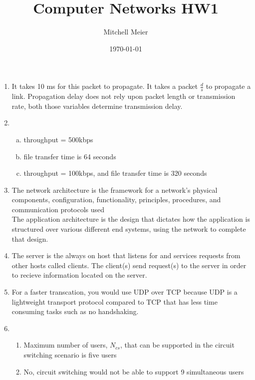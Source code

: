 \documentclass[14pt]{article}
\title{Computer Networks HW1}
\author{Mitchell Meier}
\date{\today}
\begin{document}
\maketitle

\begin{enumerate}

\item 
It takes 10 ms for this packet to propagate. It takes a packet $\frac{d}{s}$ to propagate a link. Propagation delay does not rely upon packet length or transmission rate, both those variables determine transmission delay.

\item
\begin{enumerate}[(a)]
\item throughput = 500kbps
\item file transfer time is 64 seconds
\item throughput = 100kbps, and file transfer time is 320 seconds

\end{enumerate}

\item
The network architecture is the framework for a network's physical components, configuration, functionality, principles, procedures, and communication protocols used \\
The application architecture is the design that dictates how the application is structured over various different end systems, using the network to complete that design.

\item
The server is the always on host that listens for and services requests from other hosts called clients. The client(s) send request(s) to the server in order to recieve information located on the server. 

\item
For a faster transcation, you would use UDP over TCP because UDP is a lightweight transport protocol compared to TCP that has less time consuming tasks such as no handshaking. 

\item
\begin{enumerate}[1.]
\item
Maximum number of users, $N_{cs}$, that can be supported in the circuit switching scenario is five users

\item
No, circuit switching would not be able to support 9 simultaneous users


\end{enumerate}
\end{enumerate}
\end{document}
